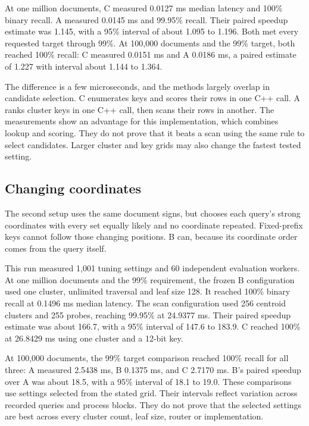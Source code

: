 At one million documents, C measured 0.0127 ms median latency and 100\% binary recall. A
measured 0.0145 ms and 99.95\% recall. Their paired speedup estimate was 1.145, with a 95\%
interval of about 1.095 to 1.196. Both met every requested target through 99\%.
At 100,000 documents and the 99\% target, both reached 100\% recall: C measured 0.0151 ms
and A 0.0186 ms, a paired estimate of 1.227 with interval about 1.144 to 1.364.

The difference is a few microseconds, and the methods largely overlap in candidate selection.
C enumerates keys and scores their rows in one C++ call. A ranks cluster keys in one C++
call, then scans their rows in another. The measurements show an advantage for this implementation, which combines lookup and scoring.
They do not prove that it beats a scan using the same rule to select candidates. Larger cluster and key grids may also
change the fastest tested setting.

\subsection{Changing coordinates}
The second setup uses the same document signs, but chooses each query's strong coordinates
with every set equally likely and no coordinate repeated. Fixed-prefix keys cannot follow those changing positions.
B can, because its coordinate order comes from the query itself.

This run measured 1,001 tuning settings and 60 independent evaluation workers. At one million
documents and the 99\% requirement, the frozen B configuration used one cluster, unlimited
traversal and leaf size 128. It reached 100\% binary recall at 0.1496 ms median latency.
The scan configuration used 256 centroid clusters and 255 probes, reaching 99.95\% at
24.9377 ms. Their paired speedup estimate was about 166.7, with a 95\% interval of
147.6 to 183.9. C reached 100\% at 26.8429 ms using one cluster and a 12-bit key.

At 100,000 documents, the 99\% target comparison reached 100\% recall for all three:
A measured 2.5438 ms, B 0.1375 ms, and C 2.7170 ms. B's paired speedup over A was about
18.5, with a 95\% interval of 18.1 to 19.0. These comparisons use settings selected from the stated grid. Their intervals reflect
variation across recorded queries and process blocks. They do not prove that the selected
settings are best across every cluster count, leaf size, router or implementation.


